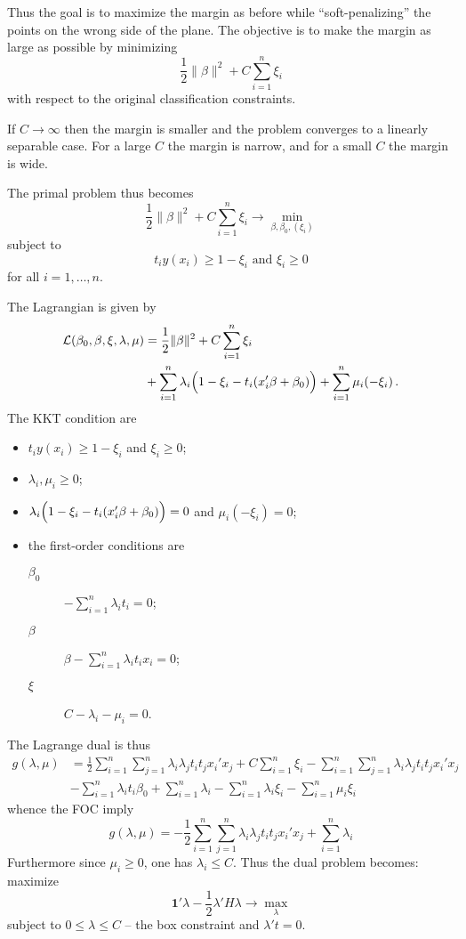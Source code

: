 \documentclass[a4paper]{article}
\newcommand{\Lcal}{\mathcal{L}}
\newcommand{\one}{\mathbf{1}}
\begin{document}
Thus the goal is to maximize the margin as before while ``soft-penalizing'' the points
on the wrong side of the plane. The objective is to make the margin as large as possible
by minimizing
\[ \frac{1}{2} \|\beta\|^2 + C \sum_{i=1}^n \xi_i \]
with respect to the original classification constraints.

If $C\to\infty$ then the margin is smaller and the problem converges to a linearly
separable case. For a large $C$ the margin is narrow, and for a small $C$ the margin
is wide. 

The primal problem thus becomes
\[ \frac{1}{2} \|\beta\|^2 + C \sum_{i=1}^n \xi_i \to \min_{\beta, \beta_0,(\xi_i)}\]
subject to 
\[ t_i y(x_i) \geq 1-\xi_i \text{ and } \xi_i\geq 0 \]
for all $i=1,\ldots,n$.

The Lagrangian is given by
\begin{align*}
	\Lcal(\beta_0,\beta,\xi,\lambda,\mu)
	&= \frac{1}{2} \|\beta\|^2 + C \sum_{i=1}^n \xi_i \\
	&+ \sum_{i=1}^n \lambda_i \Bigl( 1 - \xi_i - t_i ( x_i'\beta + \beta_0 ) \Bigr)
	+ \sum_{i=1}^n \mu_i ( - \xi_i )\,.
\end{align*}
The KKT condition are \begin{itemize}
	\item $t_i y(x_i) \geq 1-\xi_i$ and $\xi_i\geq 0$;
	\item $\lambda_i,\mu_i \geq 0$;
	\item $\lambda_i \Bigl( 1 - \xi_i - t_i ( x_i'\beta + \beta_0 ) \Bigr) = 0$ and $\mu_i ( - \xi_i ) = 0$;
	\item the first-order conditions are \begin{description}
		\item[$\beta_0$] $ -\sum_{i=1}^n \lambda_i t_i = 0$;
		\item[$\beta$] $ \beta - \sum_{i=1}^n \lambda_i t_i x_i = 0$;
		\item[$\xi$] $ C - \lambda_i - \mu_i = 0$.
	\end{description}
\end{itemize}
The Lagrange dual is thus
\begin{align*}
	g(\lambda,\mu)
	&= \frac{1}{2} \sum_{i=1}^n\sum_{j=1}^n \lambda_i\lambda_j t_i t_j x_i'x_j
		+ C \sum_{i=1}^n \xi_i
		- \sum_{i=1}^n\sum_{j=1}^n \lambda_i\lambda_j t_i t_j x_i'x_j \\
	&- \sum_{i=1}^n \lambda_i t_i \beta_0
		+ \sum_{i=1}^n \lambda_i
		- \sum_{i=1}^n \lambda_i \xi_i
		- \sum_{i=1}^n \mu_i \xi_i
\end{align*}
whence the FOC imply
\[
g(\lambda,\mu) =
- \frac{1}{2} \sum_{i=1}^n\sum_{j=1}^n \lambda_i\lambda_j t_i t_j x_i'x_j
+ \sum_{i=1}^n \lambda_i
\]
Furthermore since $\mu_i \geq 0$, one has $\lambda_i\leq C$. Thus the dual problem
becomes: maximize
\[ \one'\lambda - \frac{1}{2}\lambda'H\lambda \to \max_\lambda \]
subject to $0\leq \lambda\leq C$ -- the box constraint and $\lambda't = 0$.
\end{document}
